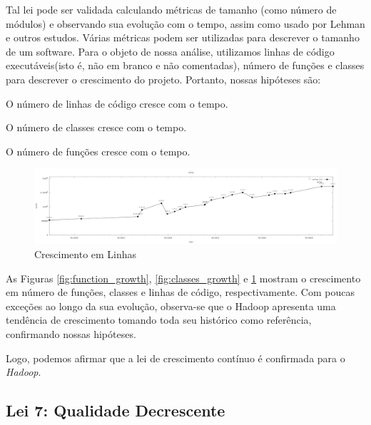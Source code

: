 Tal lei pode ser validada calculando métricas de tamanho (como número de módulos) e observando sua evolução com o tempo, assim como usado por Lehman e outros estudos\cite{lehman1980programs, lehman1985program,neamtiu2013towards}. Várias métricas podem ser utilizadas para descrever o tamanho de um software. Para o objeto de nossa análise, utilizamos linhas de código executáveis(isto é, não em branco e não comentadas), número de funções e classes para descrever o crescimento do projeto.
Portanto, nossas hipóteses são:
\begin{hypothesis}
	O número de linhas de código cresce com o tempo.
\end{hypothesis}
\begin{hypothesis}
	O número de classes cresce com o tempo.
\end{hypothesis}
\begin{hypothesis}
	O número de funções cresce com o tempo.
\end{hypothesis}

\begin{figure}
	\centering
	\includegraphics[width=1\linewidth]{figure/ncloc}
	\caption{Crescimento em Linhas}
	\label{fig:lines}
\end{figure}

As Figuras \ref{fig:function_growth}, \ref{fig:classes_growth} e \ref{fig:lines} mostram o crescimento em número de funções, classes e linhas de código, respectivamente. Com poucas exceções ao longo da sua evolução, observa-se que o Hadoop apresenta uma tendência de crescimento tomando toda seu histórico como referência, confirmando nossas hipóteses. 

Logo, podemos afirmar que a lei de crescimento contínuo é confirmada para o \textit{Hadoop}.

\subsection{Lei 7: Qualidade Decrescente}

